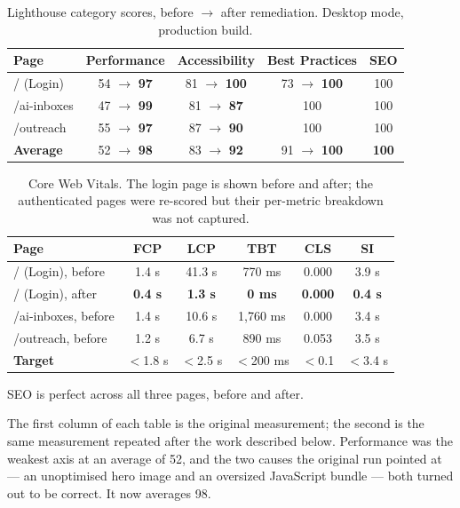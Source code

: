 \documentclass[a4paper]{article}
\renewcommand{\arraystretch}{1.5} %
\begin{document}
\begin{table}[H]
\centering
\caption{Lighthouse category scores, before $\to$ after remediation. Desktop mode, production build.}
\label{tab:lighthouse-categories}
\renewcommand{\arraystretch}{1.2}
\begin{tabular}{lcccc}
\toprule
\textbf{Page} & \textbf{Performance} & \textbf{Accessibility} & \textbf{Best Practices} & \textbf{SEO} \\
\midrule
/ (Login)        & 54 $\to$ \textbf{97} & 81 $\to$ \textbf{100} & 73 $\to$ \textbf{100} & 100 \\
/ai-inboxes      & 47 $\to$ \textbf{99} & 81 $\to$ \textbf{87}  & 100 & 100 \\
/outreach        & 55 $\to$ \textbf{97} & 87 $\to$ \textbf{90}  & 100 & 100 \\
\midrule
\textbf{Average} & 52 $\to$ \textbf{98} & 83 $\to$ \textbf{92} & 91 $\to$ \textbf{100} & \textbf{100} \\
\bottomrule
\end{tabular}
\end{table}

\begin{table}[H]
\centering
\caption{Core Web Vitals. The login page is shown before and after; the authenticated pages were re-scored but their per-metric breakdown was not captured.}
\label{tab:lighthouse-cwv}
\renewcommand{\arraystretch}{1.2}
\begin{tabular}{lccccc}
\toprule
\textbf{Page} & \textbf{FCP} & \textbf{LCP} & \textbf{TBT} & \textbf{CLS} & \textbf{SI} \\
\midrule
/ (Login), before    & 1.4 s & 41.3 s & 770 ms & 0.000 & 3.9 s \\
/ (Login), after     & \textbf{0.4 s} & \textbf{1.3 s} & \textbf{0 ms} & \textbf{0.000} & \textbf{0.4 s} \\
\midrule
/ai-inboxes, before  & 1.4 s & 10.6 s & 1{,}760 ms & 0.000 & 3.4 s \\
/outreach, before    & 1.2 s &  6.7 s & 890 ms & 0.053 & 3.5 s \\
\midrule
\textbf{Target} & $<$1.8 s & $<$2.5 s & $<$200 ms & $<$0.1 & $<$3.4 s \\
\bottomrule
\end{tabular}
\end{table}

SEO is perfect across all three pages, before and after.

The first column of each table is the original measurement; the second is the
same measurement repeated after the work described below. Performance was the
weakest axis at an average of 52, and the two causes the original run pointed
at --- an unoptimised hero image and an oversized JavaScript bundle --- both
turned out to be correct. It now averages 98.
\end{document}
